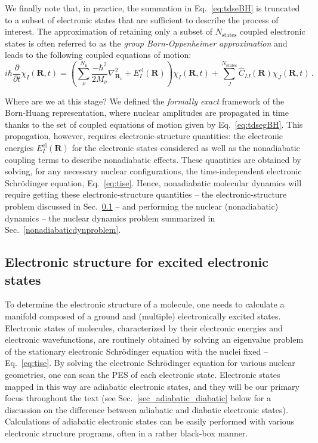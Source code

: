 \documentclass[9pt,bestpractices]{livecoms}
\begin{document}
We finally note that, in practice, the summation in Eq.~\eqref{eq:tdseBH} is truncated to a subset of electronic states that are sufficient to describe the process of interest. The approximation of retaining only a subset of $N_\text{states}$ coupled electronic states is often referred to as the \textit{group Born-Oppenheimer approximation}\cite{conicalintersection2004} and leads to the following coupled equations of motion:
\begin{equation}
i\hbar\frac{\partial}{\partial t} \chi_I(\mathbf{R},t)  = \left(\sum_\nu^{N_{\text{n}}}\frac{-\hbar^2}{2M_\nu} \nabla_{\mathbf{R}_\nu}^2 + E^{\text{el}}_{I}(\mathbf{R})\right)\chi_I(\mathbf{R},t) + \sum_J^{N_{\text{states}}} \hat{C}_{IJ}(\mathbf{R}) \chi_J(\mathbf{R},t) \, .
\label{eq:tdsegBH}
\end{equation}

Where are we at this stage? We defined the \textit{formally exact} framework of the Born-Huang representation, where nuclear amplitudes are propagated in time thanks to the set of coupled equations of motion given by Eq.~\eqref{eq:tdsegBH}. This propagation, however, requires electronic-structure quantities: the electronic energies $E^{\text{el}}_{I}(\mathbf{R})$ for the electronic states considered as well as the nonadiabatic coupling terms to describe nonadiabatic effects. These quantities are obtained by solving, for any necessary nuclear configurations, the time-independent electronic Schr\"{o}dinger equation, Eq.~\eqref{eq:tise}. Hence, nonadiabatic molecular dynamics will require getting these electronic-structure quantities -- the electronic-structure problem discussed in Sec.~\ref{elecstructproblem} -- and performing the nuclear (nonadiabatic) dynamics -- the nuclear dynamics problem summarized in Sec.~\ref{nonadiabaticdynproblem}.


\subsection{Electronic structure for excited electronic states}
\label{elecstructproblem}

To determine the electronic structure of a molecule, one needs to calculate a manifold composed of a ground and (multiple) electronically excited states. Electronic states of molecules, characterized by their electronic energies and electronic wavefunctions, are routinely obtained by solving an eigenvalue problem of the stationary electronic Schr{\"o}dinger equation with the nuclei fixed -- Eq.~\eqref{eq:tise}. By solving the electronic Schr\"{o}dinger equation for various nuclear geometries, one can scan the PES of each electronic state. Electronic states mapped in this way are adiabatic electronic states, and they will be our primary focus throughout the text (see Sec.~\ref{sec_adiabatic_diabatic} below for a discussion on the difference between adiabatic and diabatic electronic states). Calculations of adiabatic electronic states can be easily performed with various electronic structure programs, often in a rather black-box manner. 
\end{document}
